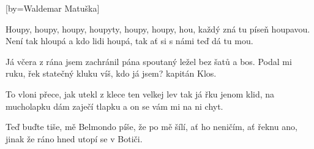 [by={Waldemar Matuška}]

\beginchorus{}
Houpy, houpy, houpy, houpyty,
houpy, houpy, hou,
každý zná tu píseň houpavou.
Není tak hloupá a kdo lidi houpá,
tak ať si s námi teď dá tu mou.
\endchorus{}

\beginverse{}
Já včera z rána jsem zachránil pána
spoutaný ležel bez šatů a bos.
Podal mi ruku, řek statečný kluku
víš, kdo já jsem? kapitán Klos.
\endverse{}

\beginchorus{}

\endchorus{}

\beginverse{}
To vloni přece, jak utekl z klece
ten velkej lev tak já řku jenom klid,
na mucholapku dám zaječí tlapku
a on se vám mi na ni chyt.
\endverse{}

\beginchorus{}

\endchorus{}

\beginverse{}
Teď buďte tiše, mě Belmondo píše,
že po mě šílí, ať ho neničím,
ať řeknu ano, jinak že ráno
hned utopí se v Botiči.
\endverse{}

\beginchorus{}

\endchorus{}

\endsong{}
